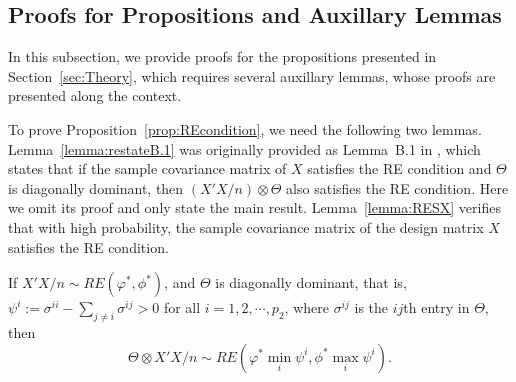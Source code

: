 \subsection{Proofs for Propositions and Auxillary Lemmas}\label{sec:proofs-proposition}

In this subsection, we provide proofs for the propositions presented in Section~\ref{sec:Theory}, which requires several auxillary lemmas, whose proofs are presented along the context. 

\medskip
To prove Proposition~\ref{prop:REcondition}, we need the following two lemmas. Lemma~\ref{lemma:restateB.1} was originally provided as Lemma~B.1 in \citet{basu2015estimation}, which states that if the sample covariance matrix of $X$ satisfies the RE condition and $\Theta$ is diagonally dominant, then $(X'X/n)\otimes \Theta$ also satisfies the RE condition. Here we omit its proof and only state the main result. Lemma~\ref{lemma:RESX} verifies that with high probability, the sample covariance matrix of the design matrix $X$ satisfies the RE condition. 

\medskip
\begin{lemma}\label{lemma:restateB.1}
If $X'X/n\sim RE(\varphi^*,\phi^*)$, and $\Theta$ is diagonally dominant, that is, $\psi^i:= \sigma^{ii}-\sum_{j\neq i} \sigma^{ij}>0$ for all $i=1,2,\cdots,p_2$, where $\sigma^{ij}$ is the $ij$th entry in $\Theta$, then
\begin{equation*}
\Theta\otimes X'X/n \sim RE\left(\varphi^*\min_i \psi^i,\phi^*\max_i\psi^i\right).
\end{equation*}
\end{lemma}
\medskip 

